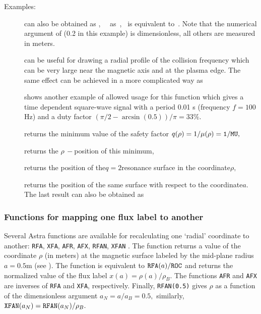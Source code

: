 \begin{description}
\item[Examples:]
\item[\quad{}] can also be obtained as ,~ 
~as~,\linebreak
{}~is equivalent to~. 
Note that the numerical argument of  (0.2 in this example) is
dimensionless, all others are measured in meters.
\item[\quad{}] can be useful for drawing a radial
profile of the collision frequency which can be very large near the
magnetic axis and at the plasma edge.
The same effect can be achieved in a more complicated way as
\item[\quad{}] shows another example of
allowed usage for this function which gives a time dependent square-wave
signal with a period 0.01 s (frequency ${f=100}$Hz) and a duty factor 
$(\pi/2-\arcsin(0.5))/\pi=33\%$.
\item[\quad{}] returns the minimum value of the safety factor
$q(\rho)=1/\mu(\rho)=\tt 1/MU,$
\item[\quad{}] returns the $\rho\,-$position of this minimum,
\item[\quad{}] returns the position of the$q=2$resonance
surface in the coordinate$\rho,$
\item[\quad{}] returns the position of the same surface
with respect to the coordinate$a.$
The last result can also be obtained as 
\end{description}

\subsubsection{Functions for mapping one flux label to another}

Several Astra functions are available for recalculating one `radial' 
coordinate to another: {\tt RFA}, {\tt XFA}, {\tt AFR}, {\tt AFX}, 
{\tt RFAN}, {\tt XFAN} . 
The function  returns a value of the coordinate $\rho$
(in meters) at the magnetic surface labeled by the mid-plane radius
$a=0.5$m (see ).
The function  is equivalent to 
${\tt RFA}(a)/{\tt ROC}$ and returns the normalized value of the flux
label $x(a)=\rho(a)/\rho_B.$ 
The functions {\tt AFR} and {\tt AFX} are inverses of {\tt RFA} and
{\tt XFA}, respectively.
Finally, {\tt RFAN(0.5)} gives $\rho$ as a function of the dimensionless
argument $a_N=a/a_B=0.5,$ similarly, 
${\tt XFAN}(a_N)={\tt RFAN}(a_N)/\rho_B.$

